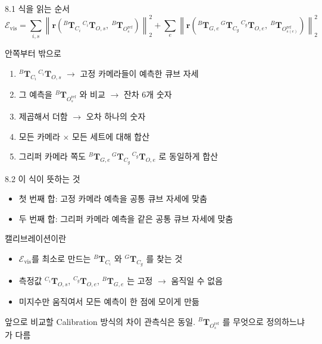 \documentclass[aspectratio=169,11pt]{beamer}
\newcommand{\T}[3][]{{}^{#2}\mathbf{T}^{#1}_{#3}}   %
\newcommand{\Oref}{O^{\mathrm{ref}}}   %
\begin{document}
\begin{frame}{8.1 식을 읽는 순서}
  \vspace{-2mm}
  {\footnotesize
  \[
    \mathcal{E}_{\mathrm{vis}}
    =
    \sum_{i,s}
    \left\|
      \mathbf{r}\left(\T{B}{C_i}\,\T{C_i}{O,s},\ \T{B}{\Oref_s}\right)
    \right\|_2^2
    +
    \sum_e
    \left\|
      \mathbf{r}\left(\T{B}{G,e}\,\T{G}{C_g}\,\T{C_g}{O,e},\ \T{B}{\Oref_{s(e)}}\right)
    \right\|_2^2
  \]
  }
  \vspace{-2mm}

  안쪽부터 밖으로
  \begin{enumerate}
    \item $\T{B}{C_i}\,\T{C_i}{O,s}$ $\rightarrow$ 고정 카메라들이 예측한 큐브 자세
    \item 그 예측을 $\T{B}{\Oref_s}$ 와 비교 $\rightarrow$ 잔차 $6$개 숫자
    \item 제곱해서 더함 $\rightarrow$ 오차 하나의 숫자
    \item 모든 카메라 $\times$ 모든 세트에 대해 합산
    \item 그리퍼 카메라 쪽도 $\T{B}{G,e}\,\T{G}{C_g}\,\T{C_g}{O,e}$ 로 동일하게 합산
  \end{enumerate}
\end{frame}

\begin{frame}{8.2 이 식이 뜻하는 것}
  \begin{itemize}
    \item 첫 번째 합: 고정 카메라 예측을 공통 큐브 자세에 맞춤
    \item 두 번째 합: 그리퍼 카메라 예측을 같은 공통 큐브 자세에 맞춤
  \end{itemize}
  \vfill
  \begin{block}{캘리브레이션이란}
    \begin{itemize}
      \item $\mathcal{E}_{\mathrm{vis}}$를 최소로 만드는
        $\T{B}{C_i}$ 와 $\T{G}{C_g}$ 를 찾는 것
      \item 측정값 $\T{C_i}{O,s}$, $\T{C_g}{O,e}$, $\T{B}{G,e}$ 는
        고정 $\rightarrow$ 움직일 수 없음
      \item 미지수만 움직여서 모든 예측이 한 점에 모이게 만듦
    \end{itemize}
  \end{block}
  \vfill
  \begin{alertblock}{앞으로 비교할 Calibration 방식의 차이}
    관측식은 동일. $\T{B}{\Oref_s}$ 를 무엇으로 정의하느냐가 다름
  \end{alertblock}
\end{frame}
\end{document}
